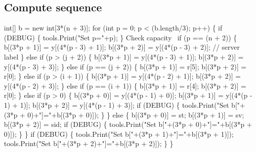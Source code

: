 \documentclass{article}
\def\nwendcode{\endtrivlist \endgroup}      %
\let\nwdocspar=\par
\begin{document}
\subsection{Compute sequence}
\nwenddocs{}\endmoddef{}
int[] b = new int[3*(n + 3)];
for (int p = 0; p < (b.length/3); p++) \{
  if (DEBUG) \{
    tools.Print("Set p="+p);
  \}
  \LA{}Check capacity~{\nwtagstyle{}}\RA{}
  if (p == (n + 2)) \{
    b[(3*p + 1)] = y[(4*(p - 3) + 1)];
    b[(3*p + 2)] = y[(4*(p - 3) + 2)];  // server label
  \} else if (p > (j + 2)) \{
    b[(3*p + 1)] = y[(4*(p - 3) + 1)];
    b[(3*p + 2)] = y[(4*(p - 3) + 3)];
  \} else if (p == (j + 2)) \{
    b[(3*p + 1)] = r[5];
    b[(3*p + 2)] = r[0];
  \} else if (p > (i + 1)) \{
    b[(3*p + 1)] = y[(4*(p - 2) + 1)];
    b[(3*p + 2)] = y[(4*(p - 2) + 3)];
  \} else if (p == (i + 1)) \{
    b[(3*p + 1)] = r[4];
    b[(3*p + 2)] = r[0];
  \} else if (p > 0) \{
    b[(3*p + 0)] = y[(4*(p - 1) + 0)];
    b[(3*p + 1)] = y[(4*(p - 1) + 1)];
    b[(3*p + 2)] = y[(4*(p - 1) + 3)];
    if (DEBUG) \{
      tools.Print("Set b["+(3*p + 0)+"]="+b[(3*p + 0)]);
    \}
  \} else \{
    b[(3*p + 0)] = st;
    b[(3*p + 1)] = sv;
    b[(3*p + 2)] = sid;
    if (DEBUG) \{
      tools.Print("Set b["+(3*p + 0)+"]="+b[(3*p + 0)]);
    \}
  \}
  if (DEBUG) \{
    tools.Print("Set b["+(3*p + 1)+"]="+b[(3*p + 1)]);
    tools.Print("Set b["+(3*p + 2)+"]="+b[(3*p + 2)]);
  \}
\}
\nwendcode{}\nwdocspar
\end{document}
